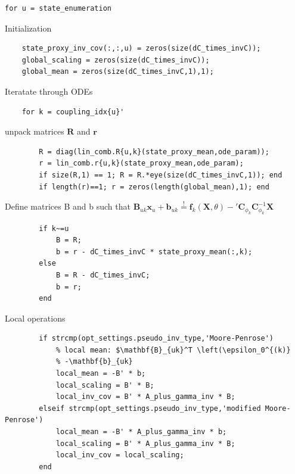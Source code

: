 \color{RoyalPurple}\begin{verbatim}
for u = state_enumeration
\end{verbatim}
\color{black}
\begin{par}
Initialization
\end{par} \vspace{1em}
\color{RoyalPurple}\begin{verbatim}
    state_proxy_inv_cov(:,:,u) = zeros(size(dC_times_invC));
    global_scaling = zeros(size(dC_times_invC));
    global_mean = zeros(size(dC_times_invC,1),1);
\end{verbatim}
\color{black}
\begin{par}
Iteratate through ODEs
\end{par} \vspace{1em}
\color{RoyalPurple}\begin{verbatim}
    for k = coupling_idx{u}'
\end{verbatim}
\color{black}
\begin{par}
unpack matrices $\mathbf{R}$ and $\mathbf{r}$
\end{par} \vspace{1em}
\color{RoyalPurple}\begin{verbatim}
        R = diag(lin_comb.R{u,k}(state_proxy_mean,ode_param));
        r = lin_comb.r{u,k}(state_proxy_mean,ode_param);
        if size(R,1) == 1; R = R.*eye(size(dC_times_invC,1)); end
        if length(r)==1; r = zeros(length(global_mean),1); end
\end{verbatim}
\color{black}
\begin{par}
Define matrices B and b such that $\mathbf{B}_{uk} \mathbf{x}_u + \mathbf{b}_{uk} \stackrel{!}{=} \mathbf{f}_k(\mathbf{X},\theta) - {'\mathbf{C}}_{\phi_{k}} \mathbf{C}_{\phi_{k}}^{-1} \mathbf{X}$
\end{par} \vspace{1em}
\color{RoyalPurple}\begin{verbatim}
        if k~=u
            B = R;
            b = r - dC_times_invC * state_proxy_mean(:,k);
        else
            B = R - dC_times_invC;
            b = r;
        end
\end{verbatim}
\color{black}
\begin{par}
Local operations
\end{par} \vspace{1em}
\color{RoyalPurple}\begin{verbatim}
        if strcmp(opt_settings.pseudo_inv_type,'Moore-Penrose')
            % local mean: $\mathbf{B}_{uk}^T \left(\epsilon_0^{(k)}
            % -\mathbf{b}_{uk}
            local_mean = -B' * b;
            local_scaling = B' * B;
            local_inv_cov = B' * A_plus_gamma_inv * B;
        elseif strcmp(opt_settings.pseudo_inv_type,'modified Moore-Penrose')
            local_mean = -B' * A_plus_gamma_inv * b;
            local_scaling = B' * A_plus_gamma_inv * B;
            local_inv_cov = local_scaling;
        end
\end{verbatim}
